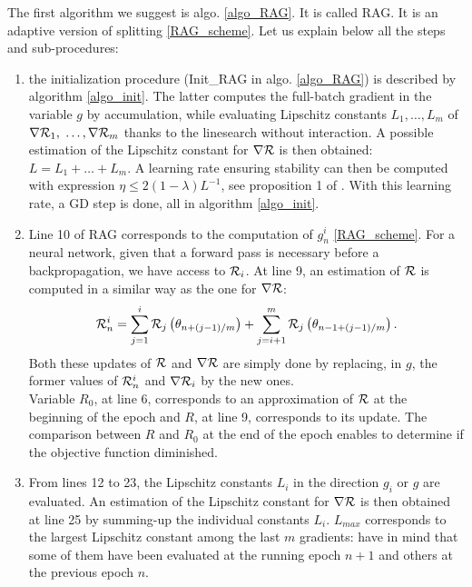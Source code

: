 The first algorithm we suggest is algo. \ref{algo_RAG}. 
It is called RAG. 
It is an adaptive version of splitting \eqref{RAG_scheme}. 
Let us explain below all the steps and sub-procedures:
\begin{enumerate}
  \item the initialization procedure (Init\_RAG in algo. \ref{algo_RAG}) is described by algorithm \ref{algo_init}. 
    The latter computes the full-batch gradient in the variable $g$ by accumulation, while evaluating Lipschitz constants $L_1, \dots, L_m$ of 
	$\nabla \mathcal{R}_1,$ $\dots, \nabla \mathcal{R}_m$ thanks to the linesearch without interaction. A possible estimation of the Lipschitz constant for $\nabla \mathcal{R}$ is then obtained: $L=L_1+\dots+L_m$. 
        A learning rate ensuring stability can then be computed with expression $\eta \leq 2(1-\lambda)L^{-1}$, see proposition 1 of \cite{Lyap_Theory_Bilel}. 
        With this learning rate, a GD step is done, all in algorithm \ref{algo_init}. 
	\item Line 10 of RAG corresponds to the computation of $g_n^i$ \eqref{RAG_scheme}. For a neural network, given that a forward pass is necessary before a backpropagation, we have access to $\mathcal{R}_i$. At line 9, an estimation of $\mathcal{R}$ is computed in a similar way as the one for $\nabla \mathcal{R}$:
	\begin{equation}
		\mathcal{R}_n^i = \sum_{j=1}^i \mathcal{R}_j\left(\theta_{n+(j-1)/m}\right)+\sum_{j=i+1}^m \mathcal{R}_j\left(\theta_{n-1+(j-1)/m}\right).
		\label{Rni}
	\end{equation}
        Both these updates of $\mathcal{R}$ and $\nabla \mathcal{R}$ are simply done by replacing, in $g$, the former values of $\mathcal{R}_n^i$ and $\nabla \mathcal{R}_i$ by the new ones.\\
	Variable $R_0$, at line 6, corresponds to an approximation of $\mathcal{R}$ at the beginning of the epoch and $R$, at line 9, corresponds to its update.  
        The comparison between $R$ and $R_0$ at the end of the epoch enables to determine if the objective function diminished. %
	\item From lines 12 to 23, the Lipschitz constants $L_i$ in the direction $g_i$ or $g$ are evaluated. 
          An estimation of the Lipschitz constant for $\nabla \mathcal{R}$ is then obtained at line 25 by summing-up the individual constants $L_i$. $L_{max}$ corresponds to the largest Lipschitz constant among the last $m$ gradients: have in mind that some of them have been evaluated at the running epoch $n+1$ and others at the previous epoch $n$.

\end{enumerate}
